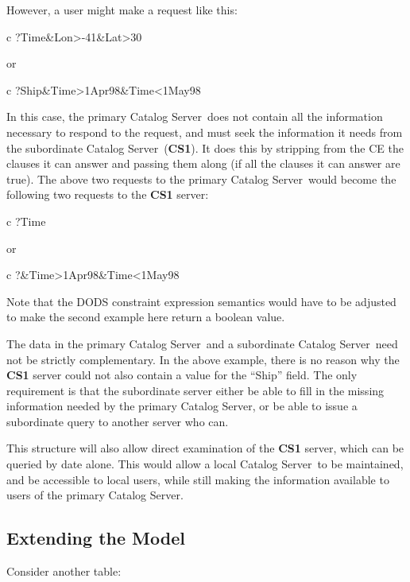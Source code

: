 \documentclass[10pt]{report}
\newcommand{\cs}{Catalog Server}
\begin{document}
However, a user might make a request like this:

\begin{code}{c}
?Time&Lon>-41&Lat>30
\end{code}

or

\begin{code}{c}
?Ship&Time>1Apr98&Time<1May98
\end{code}

In this case, the primary \cs\ does not contain all the information
necessary to respond to the request, and must seek the information it
needs from the subordinate \cs\ (\textbf{CS1}).  It does this by
stripping from the CE the clauses it can answer and passing them along
(if all the clauses it can answer are true).  The above two requests
to the primary \cs\ would become the following two requests to the
\textbf{CS1} server:

\begin{code}{c}
?Time
\end{code}

or

\begin{code}{c}
?&Time>1Apr98&Time<1May98
\end{code}

Note that the DODS constraint expression semantics would have to be
adjusted to make the second example here return a boolean value.

The data in the primary \cs\ and a subordinate \cs\ need not be
strictly complementary.  In the above example, there is no reason why
the \textbf{CS1} server could not also contain a value for the
``Ship'' field.  The only requirement is that the subordinate server
either be able to fill in the missing information needed by the
primary \cs , or be able to issue a subordinate query to another
server who can.

This structure will also allow direct examination of the \textbf{CS1}
server, which can be queried by date alone.  This would allow a local
\cs\ to be maintained, and be accessible to local users, while still
making the information available to users of the primary \cs .

\pagebreak
\subsection{Extending the Model}

Consider another table:
\end{document}
